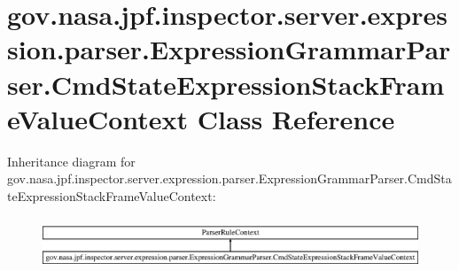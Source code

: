 \hypertarget{classgov_1_1nasa_1_1jpf_1_1inspector_1_1server_1_1expression_1_1parser_1_1_expression_grammar_pa27eac9bb10e329b6f1427633e5ce16ca}{}\section{gov.\+nasa.\+jpf.\+inspector.\+server.\+expression.\+parser.\+Expression\+Grammar\+Parser.\+Cmd\+State\+Expression\+Stack\+Frame\+Value\+Context Class Reference}
\label{classgov_1_1nasa_1_1jpf_1_1inspector_1_1server_1_1expression_1_1parser_1_1_expression_grammar_pa27eac9bb10e329b6f1427633e5ce16ca}
Inheritance diagram for gov.\+nasa.\+jpf.\+inspector.\+server.\+expression.\+parser.\+Expression\+Grammar\+Parser.\+Cmd\+State\+Expression\+Stack\+Frame\+Value\+Context\+:\begin{figure}[H]
\begin{center}
\leavevmode
\includegraphics[height=1.579690cm]{classgov_1_1nasa_1_1jpf_1_1inspector_1_1server_1_1expression_1_1parser_1_1_expression_grammar_pa27eac9bb10e329b6f1427633e5ce16ca}
\end{center}
\end{figure}
